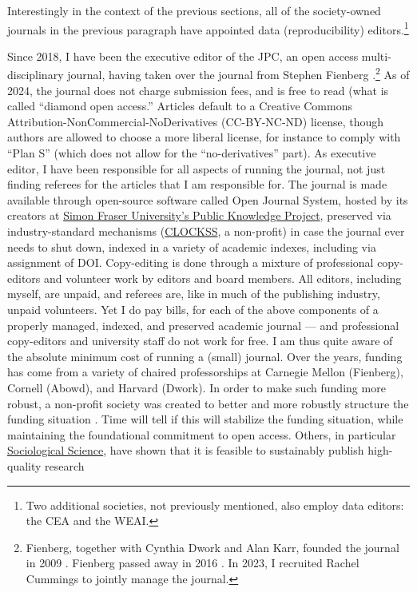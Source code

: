 \documentclass{Revue-economique}
\newcommand{\citep}{\parencite}
\begin{document}
\begin{Article} [%
	Titre={Reproducibility and Open Science in Economics},
	Auteur={Lars Vilhuber\thanks{Cornell University, lars.vilhuber@cornell.edu}}]
\begin{refsection}[Main]
Interestingly in the context of the previous sections, all of the society-owned journals in the previous paragraph have appointed  data (reproducibility) editors.\footnote{Two additional societies, not previously mentioned, also employ data editors: the \ac{CEA} and the \ac{WEAI}. }

Since 2018, I have been the executive editor of the \ac{JPC}, an open access multi-disciplinary journal, having taken over the journal from Stephen Fienberg \citep{vilhuber_relaunching_2018}.\footnote{Fienberg, together with Cynthia Dwork and Alan Karr, founded the journal in 2009 \citep{abowd_first_2009}. Fienberg passed away in 2016 \citep{slavkovic_remembering_2018}.  In 2023, I recruited Rachel Cummings to jointly manage the journal.} As of 2024, the journal does not charge submission fees, and is free to read (what is called ``diamond open access.'' Articles default to a Creative Commons Attribution-NonCommercial-NoDerivatives (CC-BY-NC-ND) license, though authors are allowed to choose a more liberal license, for instance to comply with ``Plan S'' (which does not allow for the ``no-derivatives'' part). As executive editor, I have been responsible for all aspects of running the journal, not just finding referees for the articles that I am responsible for. The journal is made available through open-source software called Open Journal System, hosted by its creators at \href{https://pkp.sfu.ca/hosting-services/hosting/journals/}{Simon Fraser University's Public Knowledge Project}, preserved via industry-standard mechanisms (\href{https://clockss.org/about/how-clockss-works/}{CLOCKSS}, a non-profit) in case the journal ever needs to shut down, indexed in a variety of academic indexes, including via assignment of \acs{DOI}. Copy-editing is done through a mixture of professional copy-editors and volunteer work by editors and board members. All editors, including myself, are unpaid, and referees are, like in much of the publishing industry, unpaid volunteers. Yet I do pay bills, for each of the above components of a properly managed, indexed, and preserved academic journal --- and professional copy-editors and university staff do not work for free. I am thus quite aware of the absolute minimum cost of running a (small) journal. Over the years, funding has come from a variety of chaired professorships at Carnegie Mellon (Fienberg), Cornell (Abowd), and Harvard (Dwork). In order to make such funding more robust, a non-profit society was created to better and more robustly structure the funding situation \citep{abowd_launching_2024}. Time will tell if this will stabilize the funding situation, while maintaining the foundational commitment to open access. Others, in particular \href{https://sociologicalscience.com/}{Sociological Science}, have shown that it is feasible to sustainably publish high-quality research 



\end{refsection}
\end{Article}
\end{document}
